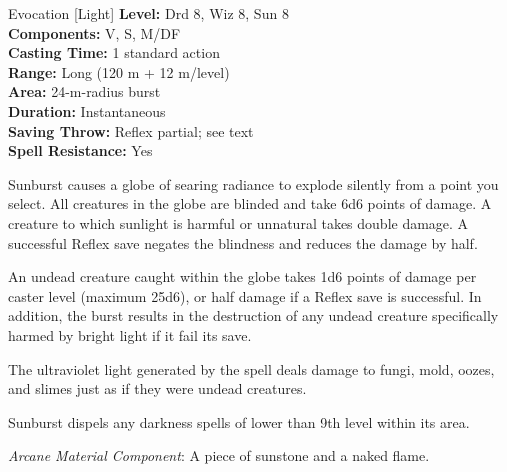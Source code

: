 {Evocation [Light]}
{
	\textbf{Level:}
	Drd 8, Wiz 8, Sun 8\\
	\textbf{Components:}
	V, S, M/DF\\
	\textbf{Casting Time:}
	1 standard action\\
	\textbf{Range:}
	Long (120 m + 12 m/level)\\
	\textbf{Area:}
	24-m-radius burst\\
	\textbf{Duration:}
	Instantaneous\\
	\textbf{Saving Throw:}
	Reflex partial; see text\\
	\textbf{Spell Resistance:}
	Yes\\
}
{
	Sunburst causes a globe of searing radiance to explode silently from a point you select. All creatures in the globe are blinded and take 6d6 points of damage. A creature to which sunlight is harmful or unnatural takes double damage. A successful Reflex save negates the blindness and reduces the damage by half.

	An undead creature caught within the globe takes 1d6 points of damage per caster level (maximum 25d6), or half damage if a Reflex save is successful. In addition, the burst results in the destruction of any undead creature specifically harmed by bright light if it fail its save.

	The ultraviolet light generated by the spell deals damage to fungi, mold, oozes, and slimes just as if they were undead creatures.

	Sunburst dispels any darkness spells of lower than 9th level within its area.

	\textit{Arcane Material Component}:
	A piece of sunstone and a naked flame.

}
